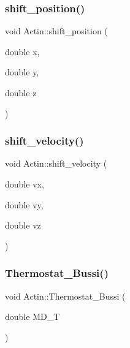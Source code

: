 \subsubsection{\texorpdfstring{shift\_position()}{shift\_position()}}
{\footnotesize\ttfamily void Actin\+::shift\+\_\+position (\begin{DoxyParamCaption}\item[{double}]{x,  }\item[{double}]{y,  }\item[{double}]{z }\end{DoxyParamCaption})\hspace{0.3cm}{\ttfamily [inline]}}

\mbox{\label{classActin_ad98f0f42b66ec4d8b5fefb2ecec47a60}} 
\subsubsection{\texorpdfstring{shift\_velocity()}{shift\_velocity()}}
{\footnotesize\ttfamily void Actin\+::shift\+\_\+velocity (\begin{DoxyParamCaption}\item[{double}]{vx,  }\item[{double}]{vy,  }\item[{double}]{vz }\end{DoxyParamCaption})\hspace{0.3cm}{\ttfamily [inline]}}

\mbox{\label{classActin_a9e73b09a4cd982adc8a4879d7960d9bf}} 
\subsubsection{\texorpdfstring{Thermostat\_Bussi()}{Thermostat\_Bussi()}}
{\footnotesize\ttfamily void Actin\+::\+Thermostat\+\_\+\+Bussi (\begin{DoxyParamCaption}\item[{double}]{M\+D\+\_\+T }\end{DoxyParamCaption})}

\mbox{\label{classActin_a501f81fc7093ff06593c5549afd1167b}} 
